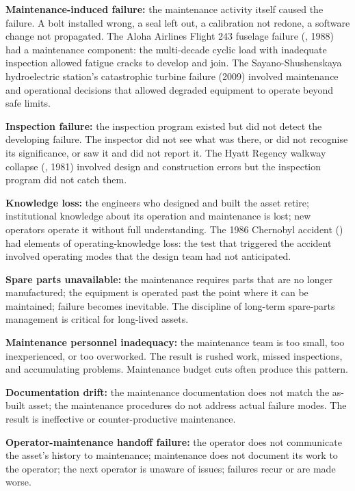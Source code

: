 \textbf{Maintenance-induced failure:} the maintenance activity itself caused the failure. A bolt installed wrong, a seal left out, a calibration not redone, a software change not propagated. The Aloha Airlines Flight 243 fuselage failure (\cite{acc:ntsb-aar94-04}, 1988) had a maintenance component: the multi-decade cyclic load with inadequate inspection allowed fatigue cracks to develop and join. The Sayano-Shushenskaya hydroelectric station's catastrophic turbine failure (2009) involved maintenance and operational decisions that allowed degraded equipment to operate beyond safe limits.

\textbf{Inspection failure:} the inspection program existed but did not detect the developing failure. The inspector did not see what was there, or did not recognise its significance, or saw it and did not report it. The Hyatt Regency walkway collapse (\cite{acc:nbs-hyatt-1982}, 1981) involved design and construction errors but the inspection program did not catch them.

\textbf{Knowledge loss:} the engineers who designed and built the asset retire; institutional knowledge about its operation and maintenance is lost; new operators operate it without full understanding. The 1986 Chernobyl accident (\cite{acc:iaea-insag7-1992}) had elements of operating-knowledge loss: the test that triggered the accident involved operating modes that the design team had not anticipated.

\textbf{Spare parts unavailable:} the maintenance requires parts that are no longer manufactured; the equipment is operated past the point where it can be maintained; failure becomes inevitable. The discipline of long-term spare-parts management is critical for long-lived assets.

\textbf{Maintenance personnel inadequacy:} the maintenance team is too small, too inexperienced, or too overworked. The result is rushed work, missed inspections, and accumulating problems. Maintenance budget cuts often produce this pattern.

\textbf{Documentation drift:} the maintenance documentation does not match the as-built asset; the maintenance procedures do not address actual failure modes. The result is ineffective or counter-productive maintenance.

\textbf{Operator-maintenance handoff failure:} the operator does not communicate the asset's history to maintenance; maintenance does not document its work to the operator; the next operator is unaware of issues; failures recur or are made worse.

